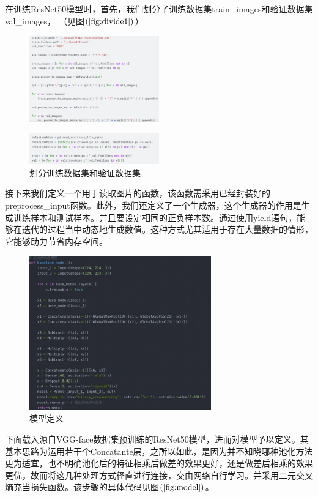 \documentclass[UTF8]{ctexart}
\begin{document}
在训练ResNet50模型时，首先，我们划分了训练数据集train\_images和验证数据集val\_images，
（见图$\left(\ref{fig:divide1}\right)$）
\begin{figure}[!ht]
  \centering
  \includegraphics[width=0.5\textwidth]{divide.jpg}
  \label{fig:divide}
\end{figure}
\begin{figure}[!ht]
  \centering
  \includegraphics[width=0.5\textwidth]{divide1.jpg}
  \caption{划分训练数据集和验证数据集}
  \label{fig:divide1}
\end{figure}
接下来我们定义一个用于读取图片的函数，该函数需采用已经封装好的preprocess\_input函数。此外，我们还定义了一个生成器，这个生成器的作用是生成训练样本和测试样本。并且要设定相同的正负样本数。通过使用yield语句，能够在迭代的过程当中动态地生成数值。这种方式尤其适用于存在大量数据的情形，它能够助力节省内存空间。

\begin{figure}[!ht]
  \centering
  \includegraphics[width=0.7\textwidth]{model.jpg}
  \caption{模型定义}
  \label{fig:model}
\end{figure}
下面载入源自VGG-face数据集预训练的ResNet50模型，进而对模型予以定义。其基本思路为运用若干个Concatante层，之所以如此，是因为并不知晓哪种池化方法更为适宜，也不明确池化后的特征相乘后做差的效果更好，还是做差后相乘的效果更优，故而将这几种处理方式径直进行连接，交由网络自行学习。并采用二元交叉熵充当损失函数。该步骤的具体代码见图$\left(\ref{fig:model}\right)$。
\end{document}
